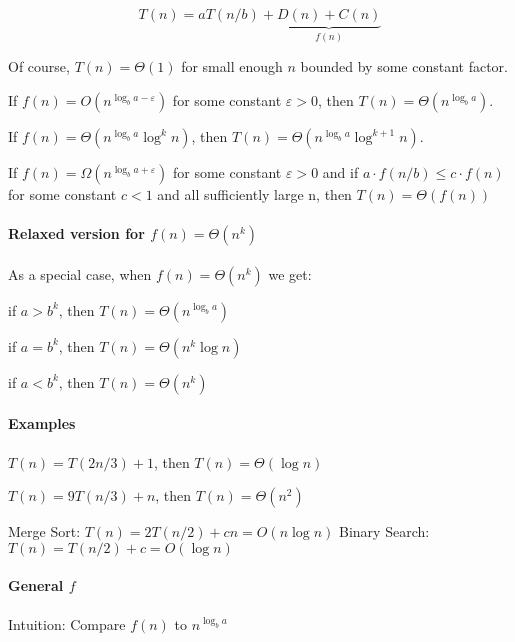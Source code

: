 \documentclass[a4paper]{article}
\newenvironment{enumerate*}%
  {\begin{enumerate}%
    \setlength{\itemsep}{0.5pt}%
    \setlength{\parsep}{0pt}%
    \setlength{\parskip}{0pt}}%
  {\end{enumerate}}
\begin{document}
\[T(n) = aT(n/b) + \underbrace{D(n) + C(n)}_{f(n)}\]

Of course, $T(n)=\Theta(1)$ for small enough $n$ bounded by some constant factor.

\begin{enumerate*}
  \item If $f(n)=O(n^{\log_b a-\varepsilon})$ for some constant $\varepsilon>0$, then $T(n)=\Theta(n^{\log_ba})$.
  \item If $f(n)=\Theta(n^{\log_ba} \log^kn)$, then $T(n)=\Theta(n^{\log_ba}\log^{k+1} n)$.
  \item If $f(n)=\Omega(n^{\log_ba+\varepsilon})$ for some constant $\varepsilon>0$ and if $a\cdot f(n/b)\le c\cdot f(n)$ for some constant $c<1$ and all sufficiently large n, then $T(n)=\Theta(f(n))$
\end{enumerate*}

\paragraph{Relaxed version for $f(n)=\Theta(n^k)$}

As a special case, when $f(n)=\Theta(n^k)$ we get:

\begin{enumerate*}
  \item if $a>b^k$, then $T(n)=\Theta(n^{\log_ba})$
  \item if $a=b^k$, then $T(n)=\Theta(n^k\log n)$
  \item if $a<b^k$, then $T(n)=\Theta(n^k)$
\end{enumerate*}

\paragraph{Examples}

\begin{enumerate*}
  \item $T(n)=T(2n/3)+1$, then $T(n)=\Theta(\log n)$
  \item $T(n)=9T(n/3)+n$, then $T(n)=\Theta(n^2)$
\end{enumerate*}

Merge Sort: $T(n)=2T(n/2)+cn=O(n\log n)$
Binary Search: $T(n)=T(n/2)+c=O(\log n)$

\paragraph{General $f$}

Intuition: Compare $f(n)$ to $n^{\log_ba}$
\end{document}
